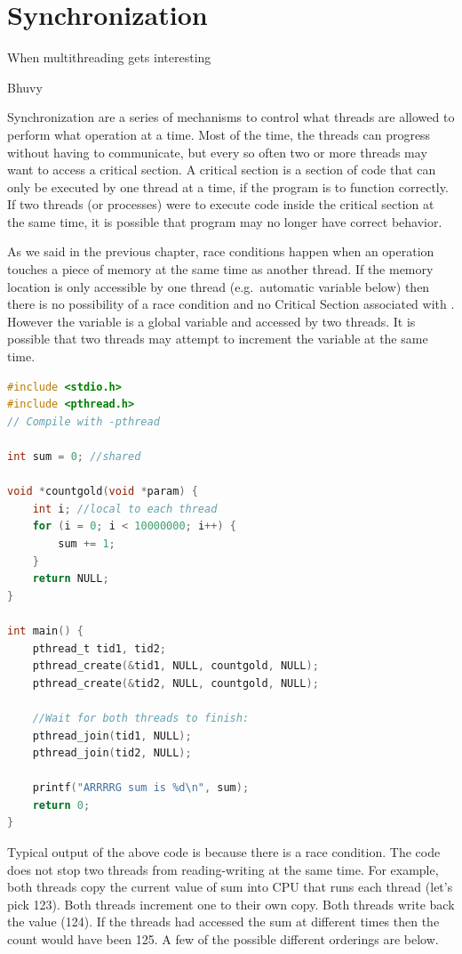 \chapter{Synchronization}

\epigraph{When multithreading gets interesting}{Bhuvy}

Synchronization are a series of mechanisms to control what threads are allowed to perform what operation at a time.
Most of the time, the threads can progress without having to communicate, but every so often two or more threads may want to access a critical section.
A critical section is a section of code that can only be executed by one thread at a time, if the program is to function correctly.
If two threads (or processes) were to execute code inside the critical section at the same time, it is possible that program may no longer have correct behavior.

As we said in the previous chapter, race conditions happen when an operation touches a piece of memory at the same time as another thread.
If the memory location is only accessible by one thread (e.g.~automatic variable  below) then there is no possibility of a race condition and no Critical Section associated with .
However the  variable is a global variable and accessed by two threads. It is possible that two threads may attempt to increment the variable at the same time.

\begin{lstlisting}[language=C]
#include <stdio.h>
#include <pthread.h>
// Compile with -pthread

int sum = 0; //shared

void *countgold(void *param) {
    int i; //local to each thread
    for (i = 0; i < 10000000; i++) {
        sum += 1;
    }
    return NULL;
}

int main() {
    pthread_t tid1, tid2;
    pthread_create(&tid1, NULL, countgold, NULL);
    pthread_create(&tid2, NULL, countgold, NULL);
    
    //Wait for both threads to finish:
    pthread_join(tid1, NULL);
    pthread_join(tid2, NULL);
    
    printf("ARRRRG sum is %d\n", sum);
    return 0;
}
\end{lstlisting}

Typical output of the above code is  because there is a race condition.
The code does not stop two threads from reading-writing  at the same time.
For example, both threads copy the current value of sum into CPU that runs each thread (let's pick 123).
Both threads increment one to their own copy.
Both threads write back the value (124).
If the threads had accessed the sum at different times then the count would have been 125.
A few of the possible different orderings are below.

